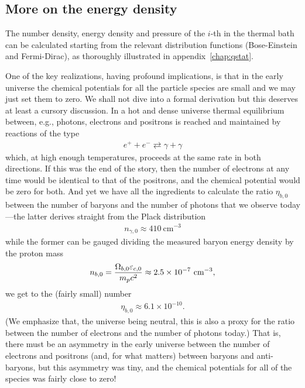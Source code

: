 \subsection{More on the energy density}

The number density, energy density and pressure of the $i$-th in the thermal bath
can be calculated starting from the relevant distribution functions (Bose-Einstein
and Fermi-Dirac), as thoroughly illustrated in appendix~\ref{chap:qstat}.

One of the key realizations, having profound implications, is that in the early
universe the chemical potentials for all the particle species are small and we may
just set them to zero. We shall not dive into a formal derivation but this deserves
at least a cursory discussion. In a hot and dense universe thermal equilibrium
between, e.g., photons, electrons and positrons is reached and maintained by reactions
of the type
\begin{align*}
  e^+ + e^- \rightleftarrows \gamma + \gamma
\end{align*}
which, at high enough temperatures, proceeds at the same rate in both directions.
If this was the end of the story, then the number of electrons at any time would
be identical to that of the positrons, and the chemical potential would be zero
for both.
And yet we have all the ingredients to calculate the ratio $\eta_{b,0}$ between the number of
baryons and the number of photons that we observe today---the latter derives straight
from the Plack distribution
\begin{align*}
  n_{\gamma,0} \approx 410~\text{cm}^{-3}
\end{align*}
while the former can be gauged dividing the measured baryon energy density by the
proton mass
\begin{align*}
  n_{b,0} = \frac{\Omega_{b,0} \varepsilon_{c,0}}{m_p c^2} \approx 2.5 \times 10^{-7}~\text{cm}^{-3},
\end{align*}
we get to the (fairly small) number
\begin{align}
  \eta_{b,0} \approx 6.1 \times 10^{-10}.
\end{align}
(We emphasize that, the universe being neutral, this is also a proxy for the ratio
between the number of electrons and the number of photons today.) That is, there
must be an asymmetry in the early universe between the number of electrons and positrons
(and, for what matters) between baryons and anti-baryons, but this asymmetry was
tiny, and the chemical potentials for all of the species was fairly close to zero!

